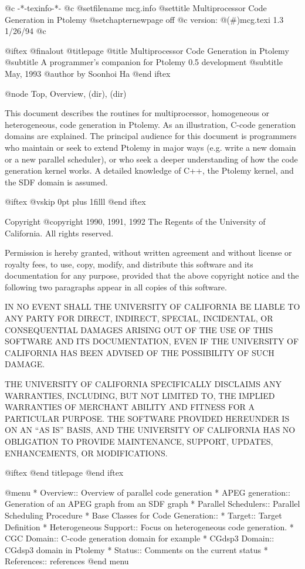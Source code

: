       @c -*-texinfo-*-
@c %
@setfilename mcg.info
@settitle Multiprocessor Code Generation in Ptolemy
@setchapternewpage off
@c version: @(#)mcg.texi	1.3	1/26/94
@c %

@iftex
@finalout
@titlepage
@title Multiprocessor Code Generation in Ptolemy
@subtitle A programmer's companion for Ptolemy 0.5 development
@subtitle May, 1993
@author by Soonhoi Ha
@end iftex

@node Top, Overview, (dir), (dir)

This document describes the routines for multiprocessor, homogeneous or
heterogeneous, code generation in Ptolemy. As an illustration, C-code
generation domains are explained. The principal audience for
this document is programmers who maintain or 
seek to extend Ptolemy in major ways
(e.g. write a new domain or a new parallel scheduler), or who seek a
deeper understanding of how the code generation kernel works.  
A detailed knowledge of C++, the Ptolemy kernel, and the SDF domain
is assumed. 

@iftex
@vskip 0pt plus 1filll
@end iftex

Copyright @copyright{} 1990, 1991, 1992 The Regents of the University of
California.  All rights reserved.

Permission is hereby granted, without written agreement and without
license or royalty fees, to use, copy, modify, and distribute this
software and its documentation for any purpose, provided that the above
copyright notice and the following two paragraphs appear in all copies of
this software.

IN NO EVENT SHALL THE UNIVERSITY OF CALIFORNIA BE LIABLE TO ANY PARTY FOR
DIRECT, INDIRECT, SPECIAL, INCIDENTAL, OR CONSEQUENTIAL DAMAGES ARISING
OUT OF THE USE OF THIS SOFTWARE AND ITS DOCUMENTATION, EVEN IF THE
UNIVERSITY OF CALIFORNIA HAS BEEN ADVISED OF THE POSSIBILITY OF SUCH
DAMAGE.

THE UNIVERSITY OF CALIFORNIA SPECIFICALLY DISCLAIMS ANY WARRANTIES,
INCLUDING, BUT NOT LIMITED TO, THE IMPLIED WARRANTIES OF MERCHANT ABILITY
AND FITNESS FOR A PARTICULAR PURPOSE. THE SOFTWARE PROVIDED HEREUNDER IS
ON AN ``AS IS'' BASIS, AND THE UNIVERSITY OF CALIFORNIA HAS NO OBLIGATION
TO PROVIDE MAINTENANCE, SUPPORT, UPDATES, ENHANCEMENTS, OR MODIFICATIONS.

@iftex
@end titlepage
@end iftex

@menu
* Overview::              	Overview of parallel code generation
* APEG generation::		Generation of an APEG graph from an SDF graph
* Parallel Schedulers::         Parallel Scheduling Procedure
* Base Classes for Code Generation:: 
* Target::          		Target Definition
* Heterogeneous Support::	Focus on heterogeneous code generation.
* CGC Domain::			C-code generation domain for example
* CGdsp3 Domain::		CGdsp3 domain in Ptolemy
* Status::			Comments on the current status
* References::			references
@end menu

